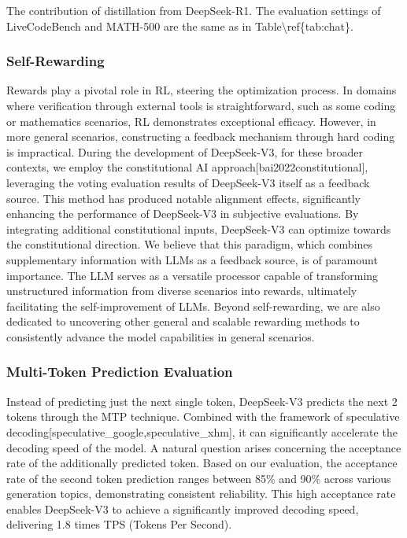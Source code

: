 \documentclass[11pt,a4paper]{article}
\begin{document}
The contribution of distillation from DeepSeek-R1. 
 The evaluation settings of LiveCodeBench and MATH-500 are the same as in Table\textbackslash{}ref\{tab:chat\}.

\subsubsection{Self-Rewarding}

Rewards play a pivotal role in RL, steering the optimization process. 
In domains where verification through external tools is straightforward, such as some coding or mathematics scenarios, RL demonstrates exceptional efficacy.
However, in more general scenarios, constructing a feedback mechanism through hard coding is impractical. 
During the development of DeepSeek-V3, for these broader contexts, we employ the constitutional AI approach[bai2022constitutional], leveraging the voting evaluation results of DeepSeek-V3 itself as a feedback source. 
This method has produced notable alignment effects, significantly enhancing the performance of DeepSeek-V3 in subjective evaluations. 
By integrating additional constitutional inputs, DeepSeek-V3 can optimize towards the constitutional direction. 
We believe that this paradigm, which combines supplementary information with LLMs as a feedback source, is of paramount importance. 
The LLM serves as a versatile processor capable of transforming unstructured information from diverse scenarios into rewards, ultimately facilitating the self-improvement of LLMs. 
Beyond self-rewarding, we are also dedicated to uncovering other general and scalable rewarding methods to consistently advance the model capabilities in general scenarios.

\subsubsection{Multi-Token Prediction Evaluation}

Instead of predicting just the next single token, DeepSeek-V3 predicts the next 2 tokens through the MTP technique. 
Combined with the framework of speculative decoding[speculative\_google,speculative\_xhm], it can significantly accelerate the decoding speed of the model. 
A natural question arises concerning the acceptance rate of the additionally predicted token. 
Based on our evaluation, the acceptance rate of the second token prediction ranges between 85\% and 90\% across various generation topics, demonstrating consistent reliability. 
This high acceptance rate enables DeepSeek-V3 to achieve a significantly improved decoding speed, delivering 1.8 times TPS (Tokens Per Second).
\end{document}
